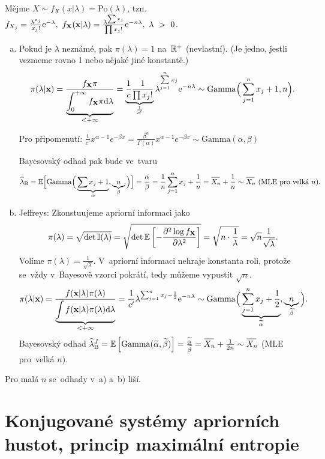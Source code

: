 \begin{example}
	Mějme $X\sim f_X(x|\lambda)=\mathrm{Po}(\lambda)$, tzn. $f_{X_j}=\frac{\lambda^{x_j}}{x_j!}\mathrm{e}^{-\lambda},~f_\textbf{X}(\textbf{x}|\lambda)=\frac{\lambda^{\sum x_j}}{\prod x_j!}\mathrm{e}^{-n\lambda},~\lambda~>~0$.\begin{enumerate}[a)]
		\item Pokud je $\lambda$ neznámé, pak $\pi(\lambda)=1$ na~$\mathbb{R}^+$ (nevlastní). (Je jedno, jestli vezmeme rovno 1 nebo nějaké jiné konstantě.)
		$$
		\pi(\lambda|\textbf{x})=\frac{f_{\textbf{X}} \pi}{\underbrace{\int_{0}^{+\infty}f_{\textbf{X}}\pi\mathrm{d}\lambda}_{<+\infty}}=\underbrace{\frac{1}{c}\frac{1}{\prod x_j!}}_{\frac{1}{c'}}\lambda^{\sum\limits_{j=1}^{n} x_j}\mathrm{e}^{-n\lambda}\sim\mathrm{Gamma}\Big(\sum\limits_{j=1}^{n} x_j+1,n\Big).$$
		
		Pro připomenutí: $\frac{1}{c'}x^{\alpha-1}e^{-\beta x}=\frac{\beta^{\alpha}}{\Gamma(\alpha)}x^{\alpha-1}e^{-\beta x } \sim \mathrm{Gamma}(\alpha,\beta) $
		
		Bayesovský odhad pak bude ve~tvaru
		 $$\widehat{\lambda}_\mathrm{B}=\E\Big[\mathrm{Gamma}\Big(\underbrace{\sum x_j+1}_{\alpha},\underbrace{n}_\beta\Big)\Big]=\frac{\alpha}{\beta}=\frac{1}{n}\sumjn x_j+\frac{1}{n}=\Oxn+\frac{1}{n}\sim \Oxn~(\text{MLE pro~velká }n).$$
		\item Jeffreys: Zkonstuujeme apriorní informaci jako $$\pi(\lambda)=\sqrt{\det \mathbb{I}(\lambda)}=\sqrt{\det \mathbb{E}\left[ -\frac{\partial^2\log f_{\textbf{X}}}{\partial\lambda^2} \right]}=\sqrt{n\cdot\frac{1}{\lambda}}=\sqrt{n}\frac{1}{\sqrt{\lambda}}.$$
		Volíme $\pi(\lambda)=\frac{1}{\sqrt{\lambda}}$. V~apriorní informaci nehraje konstanta roli, protože se~vždy v~Bayesově vzorci pokrátí, tedy můžeme vypustit $\sqrt{n}$.
		$$ \pi(\lambda|\textbf{x})=\frac{f(\textbf{x}|\lambda) \pi(\lambda)}{\underbrace{\int f(\textbf{x}|\lambda)\pi(\lambda)\mathrm{d}\lambda}_{<+\infty}}=\frac{1}{c'}\lambda^{\sum_{j=1}^n x_j-\frac{1}{2}}\mathrm{e}^{-n\lambda}\sim\mathrm{Gamma}\Big(\underbrace{\sum\limits_{j=1}^{n} x_j+\frac{1}{2}}_{\widetilde{\alpha}},\underbrace{n}_{\widetilde{\beta}}\Big).$$
		Bayesovský odhad $\widehat{\lambda}_\mathrm{B}^J=\EE{\mathrm{Gamma}(\widetilde{\alpha},\widetilde{\beta})}=\frac{\widetilde{\alpha}}{\widetilde{\beta}}=\Oxn+\frac{1}{2n}\sim\Oxn$ (MLE pro~velká $n$).
	\end{enumerate}
	Pro malá $n$ se~odhady v~a) a~b) liší.
\end{example}

\chapter{Konjugované systémy apriorních hustot, princip maximální entropie}

